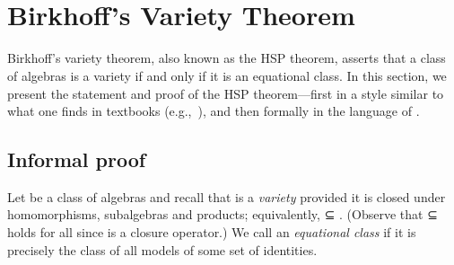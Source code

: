 \begin{code}%
\>[0]\<%
\\
%
\>[1]\AgdaSpace{}%
\AgdaSymbol{:}\AgdaSpace{}%
\AgdaSpace{}%
\AgdaSpace{}%
\AgdaSpace{}%
\AgdaSymbol{(}\AgdaSpace{}%
\AgdaSymbol{(}\AgdaSpace{}%
\AgdaSpace{}%
\AgdaSpace{}%
\AgdaSymbol{))}\AgdaSpace{}%
\AgdaSpace{}%
\AgdaSpace{}%
\AgdaOperator{\AgdaFunction{𝔽[}}\AgdaSpace{}%
\AgdaSpace{}%
\AgdaOperator{\AgdaFunction{]}}\AgdaSpace{}%
\AgdaSymbol{(}\AgdaSpace{}%
\AgdaSpace{}%
\AgdaSpace{}%
\AgdaSymbol{)}\<%
\\
%
\>[1]\AgdaSpace{}%
\AgdaSpace{}%
\AgdaSymbol{=}\AgdaSpace{}%
\AgdaSpace{}%
\AgdaSymbol{(}\AgdaSpace{}%
\AgdaSpace{}%
\AgdaSymbol{\{}\AgdaSpace{}%
\AgdaSymbol{\}}\AgdaSpace{}%
\AgdaSpace{}%
\AgdaSymbol{\{}\AgdaSpace{}%
\AgdaSymbol{=}\AgdaSpace{}%
\AgdaSymbol{\}\{}\AgdaSymbol{\}))}\AgdaSpace{}%
\<%
\end{code}
\fi



\section{Birkhoff's Variety Theorem}

Birkhoff's variety theorem, also known as the HSP theorem, asserts that a class of algebras
is a variety if and only if it is an equational class.  In this section, we present the
statement and proof of the HSP theorem---first in a style similar to
what one finds in textbooks (e.g.,~\cite[Theorem 4.41]{Bergman:2012}),
and then formally in the language of \mltt.

\subsection{Informal proof}
Let  be a class of algebras and recall that  is a \emph{variety} provided
\ifshort\else
it is closed under homomorphisms, subalgebras and products; equivalently,
\fi
{}  ⊆ .
(Observe that  ⊆   holds for all  since
 is a closure operator.)
We call  an \emph{equational class} if it is precisely the class of all models of some set of identities.

